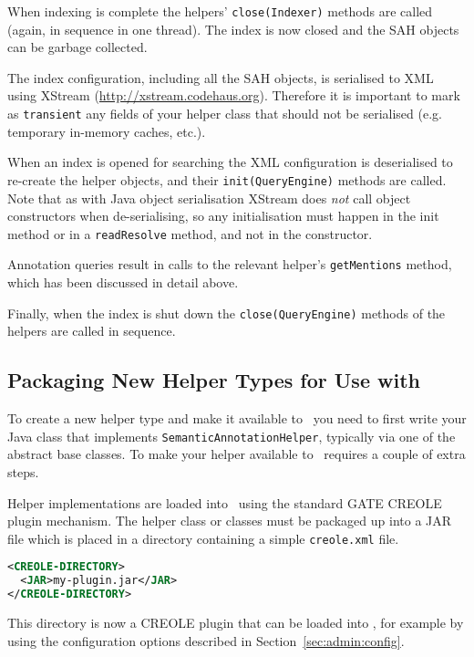 When indexing is complete the helpers' {\tt close(Indexer)} methods are called
(again, in sequence in one thread).  The index is now closed and the SAH
objects can be garbage collected.

The index configuration, including all the SAH objects, is serialised to XML
using XStream (\url{http://xstream.codehaus.org}). Therefore it is important to
mark as \lstinline!transient! any fields of your helper class that should not be
serialised (e.g. temporary in-memory caches, etc.).

When an index is opened for searching the XML configuration is deserialised to
re-create the helper objects, and their {\tt init(QueryEngine)} methods are
called.  Note that as with Java object serialisation XStream does {\em not}
call object constructors when de-serialising, so any initialisation must happen
in the init method or in a {\tt readResolve} method, and not in the
constructor.

Annotation queries result in calls to the relevant helper's {\tt getMentions}
method, which has been discussed in detail above.

Finally, when the index is shut down the {\tt close(QueryEngine)} methods of
the helpers are called in sequence.

\subsection{Packaging New Helper Types for Use with \Mimir}
\label{sec:extend-package-plugins}

To create a new helper type and make it available to \Mimir\ you need to first
write your Java class that implements {\tt SemanticAnnotationHelper}, typically
via one of the abstract base classes.  To make your helper available to \Mimir\
requires a couple of extra steps.

Helper implementations are loaded into \Mimir\ using the standard GATE CREOLE
plugin mechanism.  The helper class or classes must be packaged up into a JAR
file which is placed in a directory containing a simple {\tt creole.xml} file.
\begin{lstlisting}[language=XML]
<CREOLE-DIRECTORY>
  <JAR>my-plugin.jar</JAR>
</CREOLE-DIRECTORY>
\end{lstlisting}

This directory is now a CREOLE plugin that can be loaded into \Mimir, for
example by using the configuration options described in
Section~\ref{sec:admin:config}.
